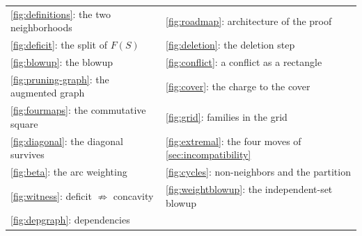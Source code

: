 \begin{center}
\small
\renewcommand{\arraystretch}{1.1}
\begin{tabular}{@{}ll@{}}
\cref{fig:definitions}: the two neighborhoods & \cref{fig:roadmap}: architecture of the proof \\
\cref{fig:deficit}: the split of $F(S)$ & \cref{fig:deletion}: the deletion step \\
\cref{fig:blowup}: the blowup & \cref{fig:conflict}: a conflict as a rectangle \\
\cref{fig:pruning-graph}: the augmented graph & \cref{fig:cover}: the charge to the cover \\
\cref{fig:fourmaps}: the commutative square & \cref{fig:grid}: families in the grid \\
\cref{fig:diagonal}: the diagonal survives & \cref{fig:extremal}: the four moves of \cref{sec:incompatibility} \\
\cref{fig:beta}: the arc weighting & \cref{fig:cycles}: non-neighbors and the partition \\
\cref{fig:witness}: deficit $\not\Rightarrow$ concavity & \cref{fig:weightblowup}: the independent-set blowup \\
\cref{fig:depgraph}: dependencies & \\
\end{tabular}
\end{center}

